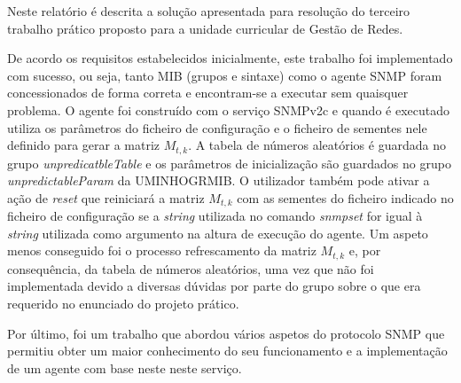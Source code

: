 \documentclass[../momento_1.tex]{subfiles}
\begin{document}
\par Neste relatório é descrita a solução apresentada para resolução do terceiro trabalho prático proposto para a unidade curricular de Gestão de Redes.\par

De acordo os requisitos estabelecidos inicialmente, este trabalho foi implementado com sucesso, ou seja, tanto MIB (grupos e sintaxe) como o agente SNMP foram concessionados de forma correta e encontram-se a executar sem quaisquer problema. O agente foi construído com o serviço SNMPv2c e quando é executado utiliza os parâmetros do ficheiro de configuração e o ficheiro de sementes nele definido para gerar a matriz $M_{t,k}$. A tabela de números aleatórios é guardada no grupo \textit{unpredicatbleTable} e os parâmetros de inicialização são guardados no grupo \textit{unpredictableParam} da UMINHOGRMIB. O utilizador também pode ativar a ação de \textit{reset} que reiniciará a matriz $M_{t,k}$ com as sementes do ficheiro indicado no ficheiro de configuração se a \textit{string} utilizada no comando \textit{snmpset} for igual à \textit{string} utilizada como argumento na altura de execução do agente. Um aspeto menos conseguido foi o processo refrescamento da matriz $M_{t,k}$ e, por consequência, da tabela de números aleatórios, uma vez que não foi implementada devido a diversas dúvidas por parte do grupo sobre o que era requerido no enunciado do projeto prático.\par

Por último, foi um trabalho que abordou vários aspetos do protocolo SNMP que permitiu obter um maior conhecimento do seu funcionamento e a implementação de um agente com base neste neste serviço.
\end{document}
